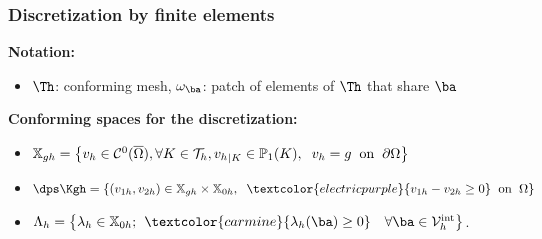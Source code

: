 \documentclass[10 pt]{beamer}
\begin{document}
\begin{frame}
\frametitle{Discretization by finite elements}
\textbf{Notation:} 
\begin{itemize}
\item
$\Th$: conforming mesh, $\omega_\ba$: patch of elements of $\Th$ that share $\ba$
\end{itemize}
\vspace{0.2 cm}
\textbf{Conforming spaces for the discretization:}
\begin{itemize}
\item
${\mathbb{X}}_{gh}=\left\{v_h \in \mathcal{C}^0(\overline{\Omega}), \forall K \in {\mathcal{T}}_h, {v_h}_{|K} \in {\mathbb{P}}_1 (K), \hspace{0.2 cm} v_h=g \hspace{0.2 cm} \mbox{on} \hspace{0.2 cm} \partial \Omega\right\}$
\item  
$\dps \Kgh=\left\{(v_{1h},v_{2h}) \in {\mathbb {X}}_{gh} \times {\mathbb{X}}_{0h}, \hspace{0.2 cm} \textcolor{electricpurple}{v_{1h}-v_{2h} \geq 0} \hspace{0.2 cm} \mbox{on} \hspace{0.2 cm} \Omega\right\}$
\item $\Lambda_h=\left\{\lambda_h \in \mathbb{X}_{0h}; \hspace{0.15 cm} \textcolor{carmine}{\lambda_h({\ba}) \geq 0} \quad \forall {\ba}\in \mathcal{V}_h^{\mathrm{int}}\right\}$.

\end{itemize}
\end{frame}
\end{document}
